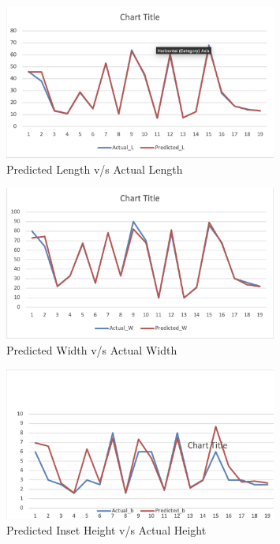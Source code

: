 \documentclass[a4paper,12pt]{report}
\begin{document}
\begin{figure}[H]
    \centering
    \includegraphics[width=0.8\textwidth]{1.png}
    \caption{Predicted Length v/s Actual Length}
    \label{fig:s1to2}
\end{figure}
\begin{figure}[H]
    \centering
    \includegraphics[width=0.8\textwidth]{2.png}
    \caption{Predicted Width v/s Actual Width}
    \label{fig:s1to2}
\end{figure}
\begin{figure}[H]
    \centering
    \includegraphics[width=0.8\textwidth]{3.png}
    \caption{Predicted Inset Height v/s Actual Height}
    \label{fig:s1to2}
\end{figure}
\end{document}
